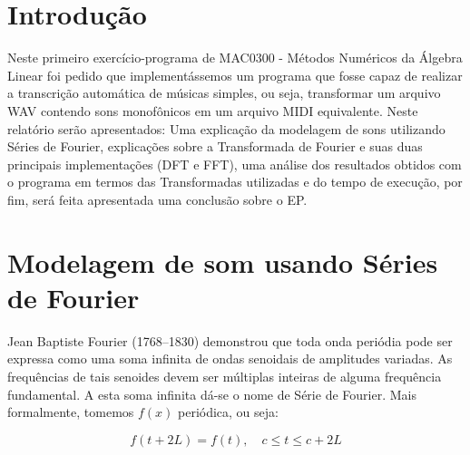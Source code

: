 \documentclass[brazil,times]{abnt}
\begin{document}





\data{\today}

\capa

\folhaderosto


\section*{Introdução\label{cap:introducao}}
	Neste primeiro exercício-programa de MAC0300 - Métodos Numéricos da Álgebra Linear foi pedido que implementássemos um programa que fosse capaz de realizar a transcrição automática de músicas simples, ou seja, transformar um arquivo WAV contendo sons monofônicos em um arquivo MIDI equivalente. Neste relatório serão apresentados: Uma explicação da modelagem de sons utilizando Séries de Fourier, explicações sobre a Transformada de Fourier e suas duas principais implementações (DFT e FFT), uma análise dos resultados obtidos com o programa em termos das Transformadas utilizadas e do tempo de execução, por fim, será feita apresentada uma conclusão sobre o EP.

\section*{Modelagem de som usando Séries de Fourier}
	Jean Baptiste Fourier (1768–1830) demonstrou que toda onda periódia pode ser expressa como uma soma infinita de ondas senoidais de amplitudes variadas. As frequências de tais senoides devem ser múltiplas inteiras de alguma frequência fundamental. A esta soma infinita dá-se o nome de Série de Fourier. Mais formalmente, tomemos $f(x)$ periódica, ou seja:


	$$f(t + 2L) = f(t), \quad c \le t \le c + 2L$$
\end{document}
